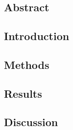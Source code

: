 \linespread{1.0}

\chapter{}
\section{Abstract}\label{sec:intro4}
\section{Introduction}
\section{Methods}
\section{Results}
\section{Discussion}





